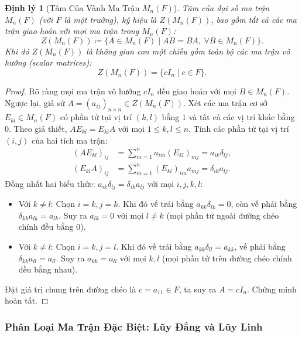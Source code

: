 \documentclass{article}
\newtheorem{dinhly}{Định lý}
\begin{document}
\begin{dinhly}[Tâm Của Vành Ma Trận $M_n(F)$]
Tâm của đại số ma trận $M_n(F)$ (với $F$ là một trường), ký hiệu là $Z(M_n(F))$, bao gồm tất cả các ma trận giao hoán với mọi ma trận trong $M_n(F)$:
\begin{equation}
    Z(M_n(F)) \coloneqq \{ A \in M_n(F) \mid AB = BA, \ \forall B \in M_n(F) \}.
\end{equation}
Khi đó $Z(M_n(F))$ là không gian con một chiều gồm toàn bộ các ma trận vô hướng (scalar matrices):
\begin{equation}
    Z(M_n(F)) = \{ c I_n \mid c \in F \}.
\end{equation}
\end{dinhly}

\begin{proof}
Rõ ràng mọi ma trận vô hướng $c I_n$ đều giao hoán với mọi $B \in M_n(F)$.
Ngược lại, giả sử $A = (a_{ij})_{n \times n} \in Z(M_n(F))$. Xét các ma trận cơ sở $E_{kl} \in M_n(F)$ có phần tử tại vị trí $(k, l)$ bằng $1$ và tất cả các vị trí khác bằng $0$.
Theo giả thiết, $A E_{kl} = E_{kl} A$ với mọi $1 \le k, l \le n$.
Tính các phần tử tại vị trí $(i, j)$ của hai tích ma trận:
\begin{align}
    (A E_{kl})_{ij} &= \sum_{m=1}^n a_{im} (E_{kl})_{mj} = a_{ik} \delta_{lj}, \\
    (E_{kl} A)_{ij} &= \sum_{m=1}^n (E_{kl})_{im} a_{mj} = \delta_{ik} a_{lj}.
\end{align}
Đồng nhất hai biểu thức: $a_{ik} \delta_{lj} = \delta_{ik} a_{lj}$ với mọi $i, j, k, l$:
\begin{itemize}
    \item Với $k \ne l$: Chọn $i = k, j = k$. Khi đó vế trái bằng $a_{kk} \delta_{lk} = 0$, còn vế phải bằng $\delta_{kk} a_{lk} = a_{lk}$. Suy ra $a_{lk} = 0$ với mọi $l \ne k$ (mọi phần tử ngoài đường chéo chính đều bằng $0$).
    \item Với $k \ne l$: Chọn $i = k, j = l$. Khi đó vế trái bằng $a_{kk} \delta_{ll} = a_{kk}$, vế phải bằng $\delta_{kk} a_{ll} = a_{ll}$. Suy ra $a_{kk} = a_{ll}$ với mọi $k, l$ (mọi phần tử trên đường chéo chính đều bằng nhau).
\end{itemize}
Đặt giá trị chung trên đường chéo là $c = a_{11} \in F$, ta suy ra $A = c I_n$. Chứng minh hoàn tất.
\end{proof}

\subsubsection*{Phân Loại Ma Trận Đặc Biệt: Lũy Đẳng và Lũy Linh}
\end{document}
